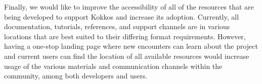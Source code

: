 Finally, we would like to improve the accessibility of all of the resources that are being developed to support Kokkos and increase its adoption. 
Currently, all documentation, tutorials, references, and support channels are in various locations that are best suited to their differing format requirements. 
However, having a one-stop landing page where new encounters can learn about the project and current users can find the location of all available resources would increase usage of the various materials and communication channels within the community, among both developers and users.

